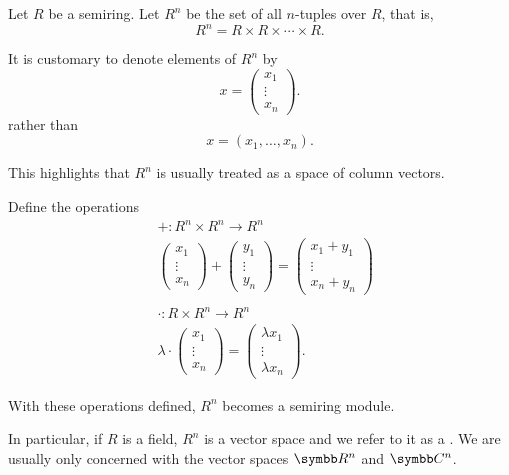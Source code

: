 \begin{definition}\label{def:left_module_of_tuples}
  Let \( R \) be a semiring. Let \( R^n \) be the set of all \( n \)-tuples over \( R \), that is,
  \begin{equation*}
    R^n = R \times R \times \cdots \times R.
  \end{equation*}

  It is customary to denote elements of \( R^n \) by
  \begin{equation*}
    x = \begin{pmatrix} x_1 \\ \vdots \\ x_n \end{pmatrix}.
  \end{equation*}
  rather than
  \begin{equation*}
    x = (x_1, \ldots, x_n).
  \end{equation*}

  This highlights that \( R^n \) is usually treated as a space of column vectors.

  Define the operations
  \begin{align*}
    &+: R^n \times R^n \to R^n
    \\
    &\begin{pmatrix} x_1 \\ \vdots \\ x_n \end{pmatrix}
    +
    \begin{pmatrix} y_1 \\ \vdots \\ y_n \end{pmatrix}
    =
    \begin{pmatrix} x_1 + y_1 \\ \vdots \\ x_n + y_n \end{pmatrix}
    \\
    \\
    &\cdot: R \times R^n \to R^n
    \\
    &\lambda \cdot \begin{pmatrix} x_1 \\ \vdots \\ x_n \end{pmatrix}
    =
    \begin{pmatrix} \lambda x_1 \\ \vdots \\ \lambda x_n \end{pmatrix}.
  \end{align*}

  With these operations defined, \( R^n \) becomes a semiring module.

  In particular, if \( R \) is a field, \( R^n \) is a vector space and we refer to it as a . We are usually only concerned with the vector spaces \( \BR^n \) and \( \BC^n \).
\end{definition}

